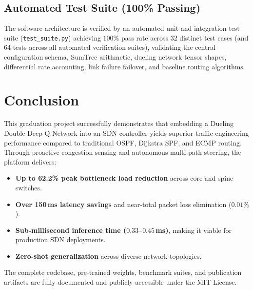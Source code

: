 \documentclass[10pt,twocolumn,a4paper]{article}
\begin{document}
\subsection{Automated Test Suite (100\% Passing)}
The software architecture is verified by an automated unit and integration test suite (\texttt{test\_suite.py}) achieving $100\%$ pass rate across 32 distinct test cases (and 64 tests across all automated verification suites), validating the central configuration schema, SumTree arithmetic, dueling network tensor shapes, differential rate accounting, link failure failover, and baseline routing algorithms.

\section{Conclusion}

This graduation project successfully demonstrates that embedding a Dueling Double Deep Q-Network into an SDN controller yields superior traffic engineering performance compared to traditional OSPF, Dijkstra SPF, and ECMP routing. Through proactive congestion sensing and autonomous multi-path steering, the platform delivers:
\begin{itemize}[leftmargin=*,itemsep=1pt,topsep=2pt]
    \item \textbf{Up to 62.2\% peak bottleneck load reduction} across core and spine switches.
    \item \textbf{Over 150\,ms latency savings} and near-total packet loss elimination ($0.01\%$).
    \item \textbf{Sub-millisecond inference time ($0.33$--$0.45$\,ms)}, making it viable for production SDN deployments.
    \item \textbf{Zero-shot generalization} across diverse network topologies.
\end{itemize}
The complete codebase, pre-trained weights, benchmark suites, and publication artifacts are fully documented and publicly accessible under the MIT License.
\end{document}
